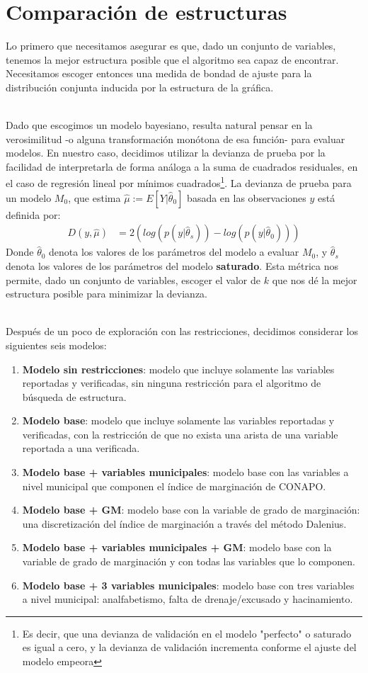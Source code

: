 \section*{Comparación de estructuras}
Lo primero que necesitamos asegurar es que, dado un conjunto de variables, tenemos la mejor estructura posible que el algoritmo sea capaz de encontrar. Necesitamos escoger entonces una medida de bondad de ajuste para la distribución conjunta inducida por la estructura de la gráfica.
\par
\noindent
\\
Dado que escogimos un modelo bayesiano, resulta natural pensar en la verosimilitud -o alguna transformación monótona de esa función- para evaluar modelos. En nuestro caso, decidimos utilizar la devianza de prueba por la facilidad de interpretarla de forma análoga a la suma de cuadrados residuales, en el caso de regresión lineal por mínimos cuadrados\footnote{Es decir, que una devianza de validación en el modelo "perfecto" o saturado es igual a cero, y la devianza de validación incrementa conforme el ajuste del modelo empeora}. La devianza de prueba para un modelo $M_0$, que estima $\hat{\mu} := E[Y|\hat{\theta}_0]$ basada en las observaciones $y$ está definida por:
\begin{align*}
D(y, \hat{\mu}) &= 2(log(p(y|\hat{\theta}_s)) - log(p(y|\hat{\theta}_0)))
\end{align*}
Donde $\hat{\theta}_0$ denota los valores de los parámetros del modelo a evaluar $M_0$, y $\hat{\theta}_s$ denota los valores de los parámetros del modelo \textbf{saturado}. Esta métrica nos permite, dado un conjunto de variables, escoger el valor de $k$ que nos dé la mejor estructura posible para minimizar la devianza.
\par
\noindent
\\
Después de un poco de exploración con las restricciones, decidimos considerar los siguientes seis modelos:
\begin{enumerate}
\item \textbf{Modelo sin restricciones}: modelo que incluye solamente las variables reportadas y verificadas, sin ninguna restricción para el algoritmo de búsqueda de estructura.
\item \textbf{Modelo base}: modelo que incluye solamente las variables reportadas y verificadas, con la restricción de que no exista una arista de una variable reportada a una verificada.
\item \textbf{Modelo base + variables municipales}: modelo base con las variables a nivel municipal que componen el índice de marginación de CONAPO.
\item \textbf{Modelo base + GM}: modelo base con la variable de grado de marginación: una discretización del índice de marginación a través del método Dalenius.
\item \textbf{Modelo base + variables municipales + GM}: modelo base con la variable de grado de marginación y con todas las variables que lo componen.
\item \textbf{Modelo base + 3 variables municipales}: modelo base con tres variables a nivel municipal: analfabetismo, falta de drenaje/excusado y hacinamiento.
\end{enumerate}
